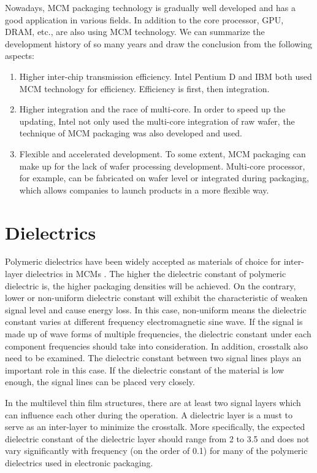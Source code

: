 \begin{spacing}{1.5}
Nowadays, MCM packaging technology is gradually well developed and has a good application in various fields. In addition to the core processor, GPU, DRAM, etc., are also using MCM technology. We can summarize the development history of so many years and draw the conclusion from the following aspects:

\begin{enumerate}
	\item Higher inter-chip transmission efficiency. Intel Pentium D and IBM both used MCM technology for efficiency. Efficiency is first, then integration.
	\item Higher integration and the race of multi-core. In order to speed up the updating, Intel not only used the multi-core integration of raw wafer, the technique of MCM packaging was also developed and used.
	\item Flexible and accelerated development. To some extent, MCM packaging can make up for the lack of wafer processing development. Multi-core processor, for example, can be fabricated on wafer level or integrated during packaging, which allows companies to launch products in a more flexible way.
\end{enumerate}



\section{Dielectrics}

Polymeric dielectrics have been widely accepted as materials of choice for inter-layer dielectrics in MCMs \cite{Principles_of_Electronic_Packaging}. The higher the dielectric constant of polymeric dielectric is, the higher packaging densities will be achieved. On the contrary, lower or non-uniform dielectric constant will exhibit the characteristic of weaken signal level and cause energy loss. In this case, non-uniform means the dielectric constant varies at different frequency electromagnetic sine wave. If the signal is made up of wave forms of multiple frequencies, the dielectric constant under each component frequencies should take into consideration. In addition, crosstalk also need to be examined. The dielectric constant between two signal lines plays an important role in this case. If the dielectric constant of the material is low enough, the signal lines can be placed very closely.

In the multilevel thin film structures, there are at least two signal layers which can influence each other during the operation. A dielectric layer is a must to serve as an inter-layer to minimize the crosstalk. More specifically, the expected dielectric constant of the dielectric layer should range from 2 to 3.5 and does not vary significantly with frequency (on the order of 0.1) for many of the polymeric dielectrics used in electronic packaging.



\end{spacing}
